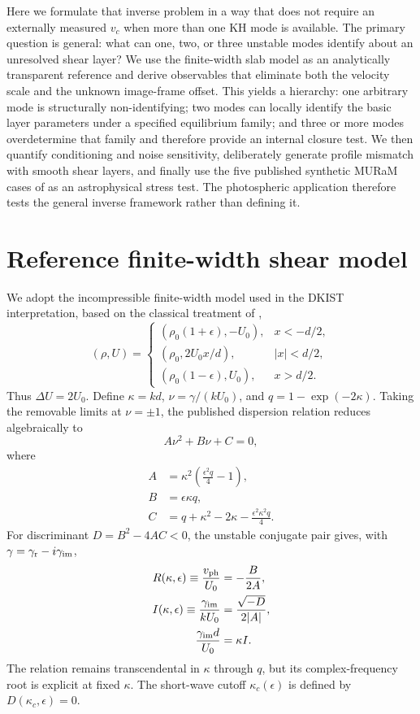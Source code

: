 \documentclass[linenumbers]{aastex7}
\begin{document}
Here we formulate that inverse problem in a way that does not require an externally measured $v_c$ when more than one KH mode is available. The primary question is general: what can one, two, or three unstable modes identify about an unresolved shear layer? We use the finite-width slab model as an analytically transparent reference and derive observables that eliminate both the velocity scale and the unknown image-frame offset. This yields a hierarchy: one arbitrary mode is structurally non-identifying; two modes can locally identify the basic layer parameters under a specified equilibrium family; and three or more modes overdetermine that family and therefore provide an internal closure test. We then quantify conditioning and noise sensitivity, deliberately generate profile mismatch with smooth shear layers, and finally use the five published synthetic MURaM cases of \citet{Kuridze2026} as an astrophysical stress test. The photospheric application therefore tests the general inverse framework rather than defining it.

\section{Reference finite-width shear model}
We adopt the incompressible finite-width model used in the DKIST interpretation, based on the classical treatment of \citet{Chandrasekhar1961},
\begin{equation}
(\rho,U)=
\left\{
\begin{array}{ll}
(\rho_0(1+\epsilon),-U_0), & x<-d/2,\\
(\rho_0,2U_0x/d), & |x|<d/2,\\
(\rho_0(1-\epsilon),U_0), & x>d/2.
\end{array}
\right.
\end{equation}
Thus $\Delta U=2U_0$. Define $\kappa=kd$, $\nu=\gamma/(kU_0)$, and $q=1-\exp(-2\kappa)$. Taking the removable limits at $\nu=\pm1$, the published dispersion relation reduces algebraically to
\begin{equation}
A\nu^2+B\nu+C=0,
\end{equation}
where
\begin{align}
A&=\kappa^2\left(\frac{\epsilon^2q}{4}-1\right),\\
B&=\epsilon\kappa q,\\
C&=q+\kappa^2-2\kappa-\frac{\epsilon^2\kappa^2q}{4}.
\end{align}
For discriminant $D=B^2-4AC<0$, the unstable conjugate pair gives, with $\gamma=\gamma_{\rm r}-i\gamma_{\rm im}$,
\begin{align}
R(\kappa,\epsilon)\equiv\frac{v_{\rm ph}}{U_0}&=-\frac{B}{2A},\\
I(\kappa,\epsilon)\equiv\frac{\gamma_{\rm im}}{kU_0}&=\frac{\sqrt{-D}}{2|A|},\\
\frac{\gamma_{\rm im}d}{U_0}&=\kappa I.
\end{align}
The relation remains transcendental in $\kappa$ through $q$, but its complex-frequency root is explicit at fixed $\kappa$. The short-wave cutoff $\kappa_c(\epsilon)$ is defined by $D(\kappa_c,\epsilon)=0$.
\end{document}
